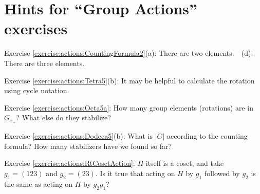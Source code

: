 \section{Hints for ``Group Actions'' exercises}\label{sec:actions:hints} 


\noindent Exercise \ref{exercise:actions:CountingFormula2}(a):   There are two elements.~~(d):   There are three elements.

\noindent Exercise \ref{exercise:actions:Tetra5}(b): It may be helpful to calculate the rotation using cycle notation.

\noindent Exercise \ref{exercise:actions:Octa5a}: How many group elements (rotations) are in $G_{x_+}$?  What else do they stabilize?

\noindent Exercise \ref{exercise:actions:Dodeca5}(b): What is $|G|$ according to the counting formula?  How many stabilizers have we found so far?

\noindent Exercise \ref{exercise:actions:RtCosetAction}: $H$ itself is a coset, and take $g_1=(123)$ and $g_2=(23)$.  Is it true that acting on $H$ by $g_1$ followed by $g_2$ is the same as acting on $H$ by $g_2 g_1$?
